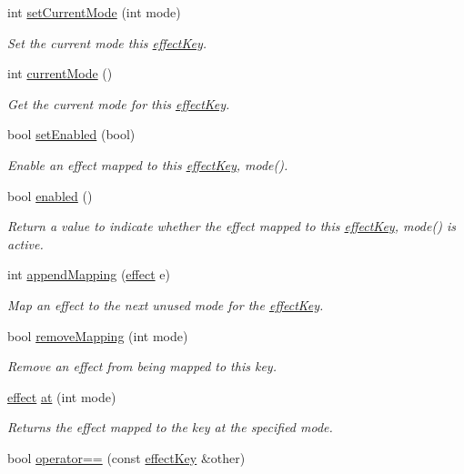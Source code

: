 \begin{DoxyCompactItemize}
int \hyperlink{classlives_1_1effectKey_a0dfed643fbaf4173c397aaa2b418c114}{set\-Current\-Mode} (int mode)
\begin{DoxyCompactList}\small\item\em Set the current mode this \hyperlink{classlives_1_1effectKey}{effect\-Key}. \end{DoxyCompactList}\item 
int \hyperlink{classlives_1_1effectKey_a3f310ea6e3a239a59b6a36aa5d26a475}{current\-Mode} ()
\begin{DoxyCompactList}\small\item\em Get the current mode for this \hyperlink{classlives_1_1effectKey}{effect\-Key}. \end{DoxyCompactList}\item 
bool \hyperlink{classlives_1_1effectKey_acadcbd5a27ec07a455929b985bf02421}{set\-Enabled} (bool)
\begin{DoxyCompactList}\small\item\em Enable an effect mapped to this \hyperlink{classlives_1_1effectKey}{effect\-Key}, mode(). \end{DoxyCompactList}\item 
bool \hyperlink{classlives_1_1effectKey_adc4b14bedffde89150e7a2da4e5cb0ad}{enabled} ()
\begin{DoxyCompactList}\small\item\em Return a value to indicate whether the effect mapped to this \hyperlink{classlives_1_1effectKey}{effect\-Key}, mode() is active. \end{DoxyCompactList}\item 
int \hyperlink{classlives_1_1effectKey_a90b3e0276cc6e42bc8861b78ee7ace62}{append\-Mapping} (\hyperlink{classlives_1_1effect}{effect} e)
\begin{DoxyCompactList}\small\item\em Map an effect to the next unused mode for the \hyperlink{classlives_1_1effectKey}{effect\-Key}. \end{DoxyCompactList}\item 
bool \hyperlink{classlives_1_1effectKey_a21c75140b4c9179d89ec57f1b33002d2}{remove\-Mapping} (int mode)
\begin{DoxyCompactList}\small\item\em Remove an effect from being mapped to this key. \end{DoxyCompactList}\item 
\hyperlink{classlives_1_1effect}{effect} \hyperlink{classlives_1_1effectKey_ad7056943355855c0f9bdc7df0b45906d}{at} (int mode)
\begin{DoxyCompactList}\small\item\em Returns the effect mapped to the key at the specified mode. \end{DoxyCompactList}\item 
bool \hyperlink{classlives_1_1effectKey_ab41c84f90b457e7f5cde247c9bf967c0}{operator==} (const \hyperlink{classlives_1_1effectKey}{effect\-Key} \&other)
\end{DoxyCompactItemize}
